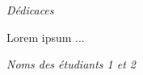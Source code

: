 \begin{center}
\Huge{\emph{Dédicaces}}
\end{center}

\vspace{1cm}

Lorem ipsum ...

\vspace{3cm}
\begin{flushright}
	\textit{Noms des étudiants 1 et  2}
\end{flushright}